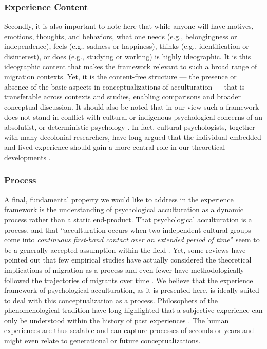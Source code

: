 \documentclass[man, 12pt, a4paper, mask]{apa7}
\begin{document}
\subsubsection{Experience Content}
Secondly, it is also important to note here that while anyone will have motives, emotions, thoughts, and behaviors, what one needs (e.g., belongingness or independence), feels (e.g., sadness or happiness), thinks (e.g., identification or disinterest), or does (e.g., studying or working) is highly ideographic. It is this ideographic content that makes the framework relevant to such a broad range of migration contexts. Yet, it is the content-free structure --- the presence or absence of the basic aspects in conceptualizations of acculturation --- that is transferable across contexts and studies, enabling comparisons and broader conceptual discussion. It should also be noted that in our view such a framework does not stand in conflict with cultural or indigenous psychological concerns of an absolutist, or deterministic psychology \citep[e.g.,][]{Kim2006a}. In fact, cultural psychologists, together with many decolonial researchers, have long argued that the individual embedded and lived experience should gain a more central role in our theoretical developments \citep[e.g., ontological turn;][]{Pedersen2020}.

\subsubsection{Process}
A final, fundamental property we would like to address in the experience framework is the understanding of psychological acculturation as a dynamic process rather than a static end-product. That psychological acculturation is a process, and that ``acculturation occurs when two independent cultural groups come into \textit{continuous first-hand contact over an extended period of time}'' \citep[][186]{Berry1989} seem to be a generally accepted assumption within the field \citep[e.g.,][]{Ward2016}. Yet, some reviews have pointed out that few empirical studies have actually considered the theoretical implications of migration as a process and even fewer have methodologically followed the trajectories of migrants over time \citep[][]{Brown2011, Ward2019}. We believe that the experience framework of psychological acculturation, as it is presented here, is ideally suited to deal with this conceptualization as a process. Philosophers of the phenomenological tradition have long highlighted that a subjective experience can only be understood within the history of past experiences \citep[e.g.,][]{Heidegger1978}. The human experiences are thus scalable and can capture processes of seconds or years and might even relate to generational or future conceptualizations.
\end{document}
